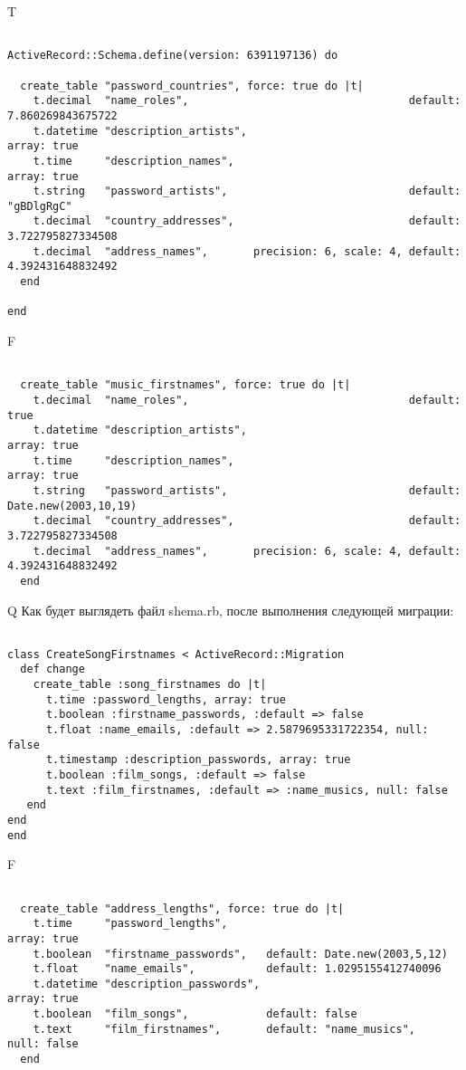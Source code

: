 T
\begin{verbatim}

ActiveRecord::Schema.define(version: 6391197136) do

  create_table "password_countries", force: true do |t|
    t.decimal  "name_roles",                                  default: 7.860269843675722
    t.datetime "description_artists",                                                     array: true
    t.time     "description_names",                                                       array: true
    t.string   "password_artists",                            default: "gBDlgRgC"
    t.decimal  "country_addresses",                           default: 3.722795827334508
    t.decimal  "address_names",       precision: 6, scale: 4, default: 4.392431648832492
  end

end
\end{verbatim}


F
\begin{verbatim}

  create_table "music_firstnames", force: true do |t|
    t.decimal  "name_roles",                                  default: true
    t.datetime "description_artists",                                                     array: true
    t.time     "description_names",                                                       array: true
    t.string   "password_artists",                            default: Date.new(2003,10,19)
    t.decimal  "country_addresses",                           default: 3.722795827334508
    t.decimal  "address_names",       precision: 6, scale: 4, default: 4.392431648832492
  end

\end{verbatim}

Q
Как будет выглядеть файл shema.rb, после выполнения следующей миграции:

\begin{verbatim}

class CreateSongFirstnames < ActiveRecord::Migration 
  def change 
    create_table :song_firstnames do |t| 
      t.time :password_lengths, array: true
      t.boolean :firstname_passwords, :default => false
      t.float :name_emails, :default => 2.5879695331722354, null: false
      t.timestamp :description_passwords, array: true
      t.boolean :film_songs, :default => false
      t.text :film_firstnames, :default => :name_musics, null: false
   end
end
end
\end{verbatim}

F
\begin{verbatim}

  create_table "address_lengths", force: true do |t|
    t.time     "password_lengths",                                                array: true
    t.boolean  "firstname_passwords",   default: Date.new(2003,5,12)
    t.float    "name_emails",           default: 1.0295155412740096
    t.datetime "description_passwords",                                           array: true
    t.boolean  "film_songs",            default: false
    t.text     "film_firstnames",       default: "name_musics",      null: false
  end

\end{verbatim}


